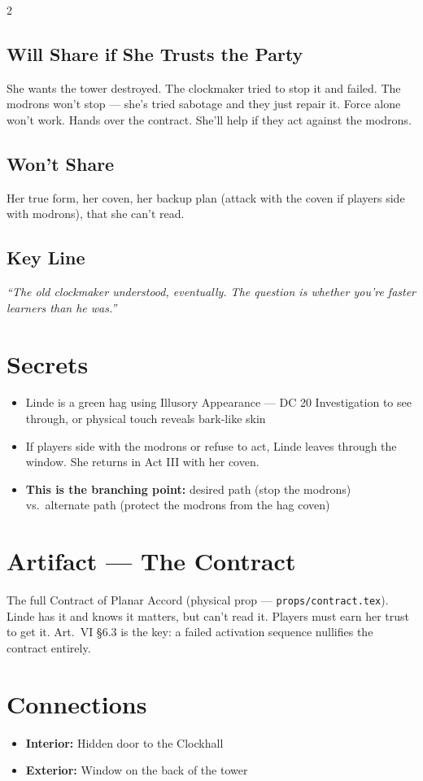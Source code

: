 \documentclass[10pt,letterpaper]{article}
\begin{document}
\begin{multicols}{2}
\subsection*{Will Share if She Trusts the Party}
She wants the tower destroyed. The clockmaker tried to stop it and failed. The modrons won't stop --- she's tried sabotage and they just repair it. Force alone won't work. Hands over the contract. She'll help if they act against the modrons.
\subsection*{Won't Share}
Her true form, her coven, her backup plan (attack with the coven if players side with modrons), that she can't read.
\subsection*{Key Line}
\textit{``The old clockmaker understood, eventually. The question is whether you're faster learners than he was.''}

\columnbreak

\section*{Secrets}
\begin{itemize}
\item Linde is a green hag using Illusory Appearance --- DC 20 Investigation to see through, or physical touch reveals bark-like skin
\item If players side with the modrons or refuse to act, Linde leaves through the window. She returns in Act III with her coven.
\item \textbf{This is the branching point:} desired path (stop the modrons) vs.\ alternate path (protect the modrons from the hag coven)
\end{itemize}

\section*{Artifact --- The Contract}
The full Contract of Planar Accord (physical prop --- \texttt{props/contract.tex}). Linde has it and knows it matters, but can't read it. Players must earn her trust to get it. Art.\ VI \S6.3 is the key: a failed activation sequence nullifies the contract entirely.

\section*{Connections}
\begin{itemize}
\item \textbf{Interior:} Hidden door to the Clockhall
\item \textbf{Exterior:} Window on the back of the tower
\end{itemize}


\end{multicols}
\end{document}
